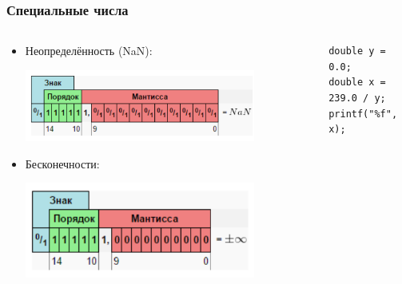 \documentclass[xetex,mathserif,serif]{beamer}
\begin{document}
    \begin{frame}[fragile]
        \frametitle{Специальные числа}
        \begin{columns}
            \begin{column}{0.6\textwidth}
                \begin{itemize}
                    \item Неопределённость (NaN):
                    \begin{center}
                        \includegraphics[width=0.8\textwidth]{nan.png}
                    \end{center}
                    \item Бесконечности:
                    \begin{center}
                        \includegraphics[width=0.8\textwidth]{infinity.png}
                    \end{center}
                \end{itemize}
            \end{column}
            \begin{column}{0.4\textwidth}
                \begin{footnotesize}
                    \begin{verbatim}
double y = 0.0;
double x = 239.0 / y;
printf("%f", x);
                    \end{verbatim}
                \end{footnotesize}
            \end{column}
        \end{columns}
    \end{frame}
\end{document}
